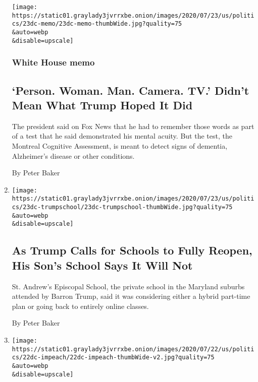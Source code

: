 \begin{enumerate}
  \texttt{[image: https://static01.graylady3jvrrxbe.onion/images/2020/07/23/us/politics/23dc-memo/23dc-memo-thumbWide.jpg?quality=75\\\&auto=webp\\\&disable=upscale]}

  \hypertarget{white-house-memo}{%
  \subsubsection{White House memo}\label{white-house-memo}}

  \hypertarget{person-woman-man-camera-tv-didnt-mean-what-trump-hoped-it-did}{%
  \subsection{`Person. Woman. Man. Camera. TV.' Didn't Mean What Trump
  Hoped It
  Did}\label{person-woman-man-camera-tv-didnt-mean-what-trump-hoped-it-did}}

  The president said on Fox News that he had to remember those words as
  part of a test that he said demonstrated his mental acuity. But the
  test, the Montreal Cognitive Assessment, is meant to detect signs of
  dementia, Alzheimer's disease or other conditions.

  By Peter Baker
\item
  \href{/2020/07/23/us/politics/barron-trump-school-coronavirus.html}{}

  \texttt{[image: https://static01.graylady3jvrrxbe.onion/images/2020/07/23/us/politics/23dc-trumpschool/23dc-trumpschool-thumbWide.jpg?quality=75\\\&auto=webp\\\&disable=upscale]}

  \hypertarget{as-trump-calls-for-schools-to-fully-reopen-his-sons-school-says-it-will-not}{%
  \subsection{As Trump Calls for Schools to Fully Reopen, His Son's
  School Says It Will
  Not}\label{as-trump-calls-for-schools-to-fully-reopen-his-sons-school-says-it-will-not}}

  St. Andrew's Episcopal School, the private school in the Maryland
  suburbs attended by Barron Trump, said it was considering either a
  hybrid part-time plan or going back to entirely online classes.

  By Peter Baker
\item
  \href{/2020/07/22/us/politics/trump-impeachment.html}{}

  \texttt{[image: https://static01.graylady3jvrrxbe.onion/images/2020/07/22/us/politics/22dc-impeach/22dc-impeach-thumbWide-v2.jpg?quality=75\\\&auto=webp\\\&disable=upscale]}


\end{enumerate}
